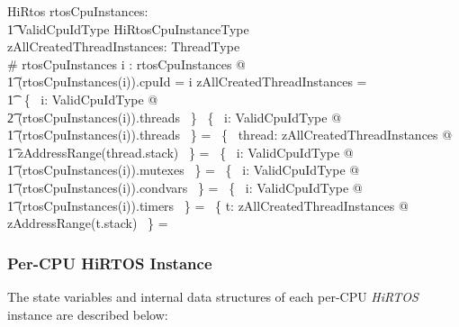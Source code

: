 \documentclass[11pt,letterpaper,twoside,openany]{book}
\begin{document}
\begin{schema}{HiRtos}
    rtosCpuInstances: \\
    \t1 ValidCpuIdType \finj HiRtosCpuInstanceType \\
    zAllCreatedThreadInstances: \finset ThreadType \\
\where
    \# rtosCpuInstances 
\also
    \forall i : \dom rtosCpuInstances @ \\
\t1   (rtosCpuInstances(i)).cpuId = i
\also
    zAllCreatedThreadInstances = \\
\t1    \bigcup~\{~ i: ValidCpuIdType @ \\
\t2    \ran (rtosCpuInstances(i)).threads ~\}
\also
    \bigcap~\{~ i: ValidCpuIdType @ \\
\t1    \ran (rtosCpuInstances(i)).threads ~\} = \emptyset
\also
    \bigcap~\{~ thread: zAllCreatedThreadInstances @ \\
\t1    zAddressRange(thread.stack) ~\} = \emptyset
\also
    \bigcap~\{~ i: ValidCpuIdType @ \\
\t1    \ran (rtosCpuInstances(i)).mutexes ~\} = \emptyset
\also
    \bigcap~\{~ i: ValidCpuIdType @ \\
\t1    \ran (rtosCpuInstances(i)).condvars ~\} = \emptyset
\also
    \bigcap~\{~ i: ValidCpuIdType @ \\
\t1    \ran (rtosCpuInstances(i)).timers ~\} = \emptyset
\also
    \bigcap~\{ t: zAllCreatedThreadInstances @ zAddressRange(t.stack) ~\} = \emptyset
\end{schema}

\subsubsection{Per-CPU HiRTOS Instance}

The state variables and internal data structures of each per-CPU \emph{HiRTOS} instance
are described below:
\end{document}
